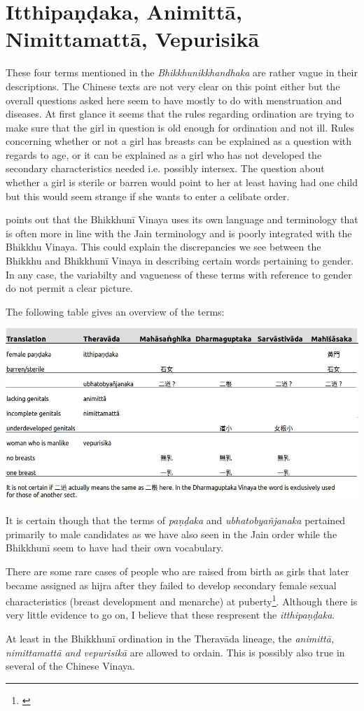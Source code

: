 \section{Itthipaṇḍaka, Animittā, Nimittamattā, Vepurisikā}

These four terms mentioned in the {\em Bhikkhunikkhandhaka} are rather vague in their descriptions. The Chinese texts are not very clear on this point either but the overall questions asked here seem to have mostly to do with menstruation and diseases. At first glance it seems that the rules regarding ordination are trying to make sure that the girl in question is old enough for ordination and not ill. Rules concerning whether or not a girl has breasts can be explained as a question with regards to age, or it can be explained as a girl who has not developed the secondary characteristics needed i.e. possibly intersex. The question about whether a girl is sterile or barren would point to her at least having had one child but this would seem strange if she wants to enter a celibate order. 

\cite{sujato2009} points out that the Bhikkhunī Vinaya uses its own language and terminology that is often more in line with the Jain terminology and is poorly integrated with the Bhikkhu Vinaya. This could explain the discrepancies we see between the Bhikkhu and Bhikkhunī Vinaya in describing certain words pertaining to gender. In any case, the variabilty and vagueness of these terms with reference to gender do not permit a clear picture.

The following table gives an overview of the terms:

\bigskip
\includegraphics[width=\linewidth]{female.jpg}
\label{female}

It is certain though that the terms of {\em paṇḍaka} and {\em ubhatob­yañ­janaka} pertained primarily to male candidates as we have also seen in the Jain order while the Bhikkhunī seem to have had their own vocabulary.

There are some rare cases of people who are raised from birth as girls that later became assigned as hijra after they failed to develop secondary female sexual characteristics (breast development and menarche) at puberty\footnote{\cite{nanda}}. Although there is very little evidence to go on, I believe that these respresent the {\em itthipaṇḍaka}.

At least in the Bhikkhunī ordination in the Theravāda lineage, the {\em animittā, nimittamattā and vepurisikā} are allowed to ordain. This is possibly also true in several of the Chinese Vinaya.
